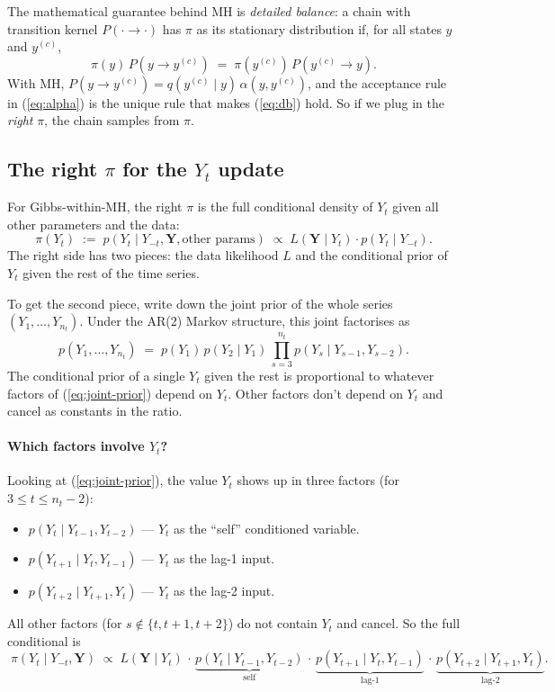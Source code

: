 \documentclass[11pt]{article}
\newcommand{\bY}{\mathbf{Y}}
\newcommand{\eref}[1]{(\ref{#1})}
\theoremstyle{plain}
\theoremstyle{definition}
\theoremstyle{remark}
\begin{document}
The mathematical guarantee behind MH is \emph{detailed balance}: a chain
with transition kernel $P(\cdot \to \cdot)$ has $\pi$ as its stationary
distribution if, for all states $y$ and $y^{(c)}$,
\begin{equation}\label{eq:db}
  \pi(y)\, P(y \to y^{(c)}) \;=\; \pi(y^{(c)})\, P(y^{(c)} \to y).
\end{equation}
With MH, $P(y \to y^{(c)}) = q(y^{(c)} \mid y)\, \alpha(y, y^{(c)})$, and
the acceptance rule in \eref{eq:alpha} is the unique rule that makes
\eref{eq:db} hold. So if we plug in the \emph{right} $\pi$, the chain
samples from $\pi$.

\subsection{The right \texorpdfstring{$\pi$}{pi} for the \texorpdfstring{$Y_t$}{Yt} update}\label{sec:right-pi}

For Gibbs-within-MH, the right $\pi$ is the full conditional density of
$Y_t$ given all other parameters and the data:
\[
  \pi(Y_t)
  \;:=\; p(Y_t \mid Y_{-t}, \bY, \text{other params})
  \;\propto\; L(\bY \mid Y_t) \cdot p(Y_t \mid Y_{-t}).
\]
The right side has two pieces: the data likelihood $L$ and the
conditional prior of $Y_t$ given the rest of the time series.

To get the second piece, write down the joint prior of the whole series
$(Y_1, \ldots, Y_{n_t})$. Under the AR(2) Markov structure, this joint
factorises as
\begin{equation}\label{eq:joint-prior}
  p(Y_1, \ldots, Y_{n_t})
  \;=\; p(Y_1)\, p(Y_2 \mid Y_1)\,
        \prod_{s=3}^{n_t} p(Y_s \mid Y_{s-1}, Y_{s-2}).
\end{equation}
The conditional prior of a single $Y_t$ given the rest is proportional
to whatever factors of \eref{eq:joint-prior} depend on $Y_t$. Other
factors don't depend on $Y_t$ and cancel as constants in the ratio.

\paragraph{Which factors involve $Y_t$?}
Looking at \eref{eq:joint-prior}, the value $Y_t$ shows up in three
factors (for $3 \leq t \leq n_t - 2$):
\begin{itemize}
  \item $p(Y_t \mid Y_{t-1}, Y_{t-2})$ --- $Y_t$ as the ``self''
        conditioned variable.
  \item $p(Y_{t+1} \mid Y_t, Y_{t-1})$ --- $Y_t$ as the lag-1 input.
  \item $p(Y_{t+2} \mid Y_{t+1}, Y_t)$ --- $Y_t$ as the lag-2 input.
\end{itemize}
All other factors (for $s \notin \{t, t+1, t+2\}$) do not contain $Y_t$
and cancel. So the full conditional is
\begin{equation}\label{eq:full-cond}
  \boxed{\;
  \pi(Y_t \mid Y_{-t}, \bY)
  \;\propto\;
  L(\bY \mid Y_t)\,\cdot\,
  \underbrace{p(Y_t \mid Y_{t-1}, Y_{t-2})}_{\text{self}}
  \,\cdot\,
  \underbrace{p(Y_{t+1} \mid Y_t, Y_{t-1})}_{\text{lag-1}}
  \,\cdot\,
  \underbrace{p(Y_{t+2} \mid Y_{t+1}, Y_t)}_{\text{lag-2}}.
  \;}
\end{equation}
\end{document}
